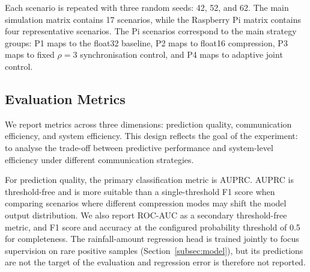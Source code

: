 \documentclass[conference]{IEEEtran}
\begin{document}
Each scenario is repeated with three random seeds: 42, 52, and 62. The main simulation matrix contains 17 scenarios, while the Raspberry Pi matrix contains four representative scenarios. The Pi scenarios correspond to the main strategy groups: P1 maps to the float32 baseline, P2 maps to float16 compression, P3 maps to fixed $\rho{=}3$ synchronisation control, and P4 maps to adaptive joint control.

\begin{table}[H]
\centering
\caption{Raspberry Pi experiment matrix.}
\label{tab:raspberry_pi_matrix}
\end{table}

\subsection{Evaluation Metrics}
\label{subsec:evaluation_metrics}

We report metrics across three dimensions: prediction quality, communication efficiency, and system efficiency. This design reflects the goal of the experiment: to analyse the trade-off between predictive performance and system-level efficiency under different communication strategies.

For prediction quality, the primary classification metric is AUPRC. AUPRC is threshold-free and is more suitable than a single-threshold F1 score when comparing scenarios where different compression modes may shift the model output distribution. We also report ROC-AUC as a secondary threshold-free metric, and F1 score and accuracy at the configured probability threshold of 0.5 for completeness. The rainfall-amount regression head is trained jointly to focus supervision on rare positive samples (Section~\ref{subsec:model}), but its predictions are not the target of the evaluation and regression error is therefore not reported.
\end{document}
